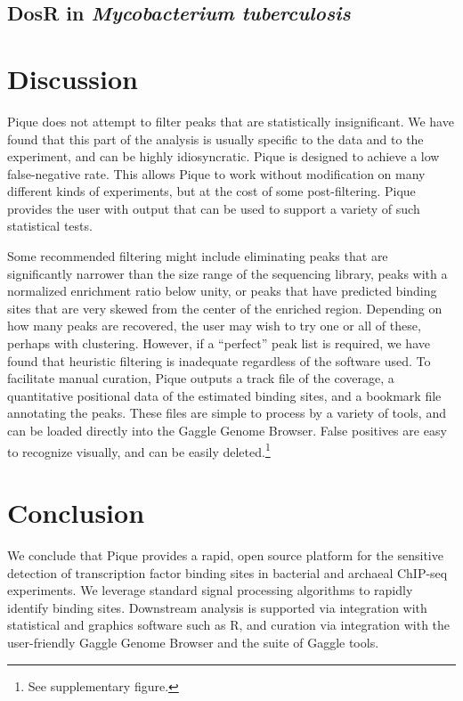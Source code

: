 \documentclass{bioinfo}
\begin{document}
\subsection{DosR in {\em Mycobacterium tuberculosis}}


\section{Discussion}

Pique does not attempt to filter peaks that are statistically
insignificant. We have found that this part of the analysis is usually
specific to the data and to the experiment, and can be highly
idiosyncratic. Pique is designed to achieve a low false-negative
rate. This allows Pique to work without modification on many different
kinds of experiments, but at the cost of some post-filtering. Pique
provides the user with output that can be used to support a variety of
such statistical tests.

Some recommended filtering might include eliminating peaks that are
significantly narrower than the size range of the sequencing library,
peaks with a normalized enrichment ratio below unity, or peaks that
have predicted binding sites that are very skewed from the center of
the enriched region. Depending on how many peaks are recovered, the
user may wish to try one or all of these, perhaps with
clustering. However, if a ``perfect'' peak list is required, we have
found that heuristic filtering is inadequate regardless of the
software used. To facilitate manual curation, Pique outputs a track
file of the coverage, a quantitative positional data of the estimated
binding sites, and a bookmark file annotating the peaks. These files
are simple to process by a variety of tools, and can be loaded
directly into the Gaggle Genome Browser. False positives are easy to
recognize visually, and can be easily deleted.\footnote{See
  supplementary figure.}







\section{Conclusion}

We conclude that Pique provides a rapid, open source platform for the
sensitive detection of transcription factor binding sites in bacterial
and archaeal ChIP-seq experiments. We leverage standard signal
processing algorithms to rapidly identify binding sites. Downstream
analysis is supported via integration with statistical and graphics
software such as R, and curation via integration with the
user-friendly Gaggle Genome Browser and the suite of Gaggle tools.
\end{document}
